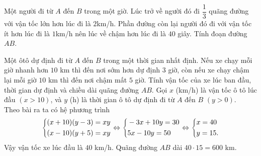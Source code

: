 \begin{bt}%
 Một người đi từ $A$ đến $B$ trong một giờ. Lúc trở về người đó đi $\dfrac{1}{3}$ quãng đường với vận tốc lớn hơn lúc đi là $2$km/h. Phần đường còn lại người đó đi với vận tốc ít hơn lúc đi là $1$km/h nên lúc về chậm hơn lúc đi là $40$ giây. Tính đoạn đường $AB$.
\end{bt} 
 
\begin{bt}%
Một ôtô dự định đi từ  $A$  đến  $B$  trong một thời gian nhất định. Nếu xe chạy mỗi giờ  nhanh hơn  $10$ km thì đến nơi sớm hơn dự định $ 3 $ giờ, còn nếu xe chạy chậm lại mỗi giờ  $10$ km  thì đến nơi chậm mất  $ 5 $ giờ. Tính vận tốc của xe lúc ban đầu, thời gian dự định và chiều dài quãng đường  $AB$.	
	\loigiai
	{
Gọi $ x $ (km/h) là vận tốc ô tô lúc đầu $ (x>10) $, và $ y $ (h) là thời gian ô tô dự định đi từ $ A $ đến $ B $ $ (y>0) $.\\
Theo bài ra ta có hệ phương trình 
\[\left\{\begin{aligned}&(x+10)(y-3)=xy\\&(x-10)(y+5)=xy\end{aligned}\right. \Leftrightarrow \left\{\begin{aligned}&-3x+10y=30\\&5x-10y=50\end{aligned}\right. \Leftrightarrow \left\{\begin{aligned}&x=40\\&y=15.\end{aligned}\right. \]
Vậy vận tốc xe lúc đầu là $ 40 $ km/h. Quãng đường $ AB $ dài $40 \cdot 15= 600 $ km.
	}
\end{bt}


